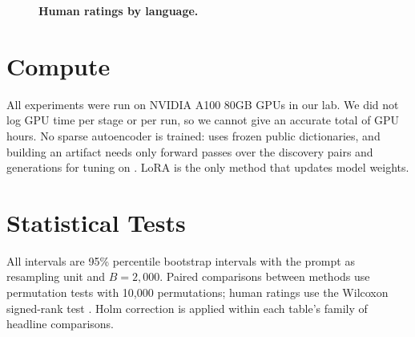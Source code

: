 \begin{figure}[!htbp]
  \centering
  \caption{\textbf{Human ratings by language.}}
  \label{fig:app-human}
\end{figure}

\section{Compute}
\label{app:cost}

All experiments were run on NVIDIA A100 80GB GPUs in our lab. We did not log GPU time per stage or per run, so we cannot give an accurate total of GPU hours. No sparse autoencoder is trained: \foxp uses frozen public dictionaries, and building an artifact needs only forward passes over the discovery pairs and generations for tuning on \Ddev. LoRA is the only method that updates model weights.

\section{Statistical Tests}
\label{app:stats}

All intervals are 95\% percentile bootstrap intervals \citep{efron1993introduction} with the prompt as resampling unit and $B=2{,}000$. Paired comparisons between methods use permutation tests with 10{,}000 permutations; human ratings use the Wilcoxon signed-rank test \citep{wilcoxon1945individual}. Holm correction \citep{holm1979simple} is applied within each table's family of headline comparisons.

